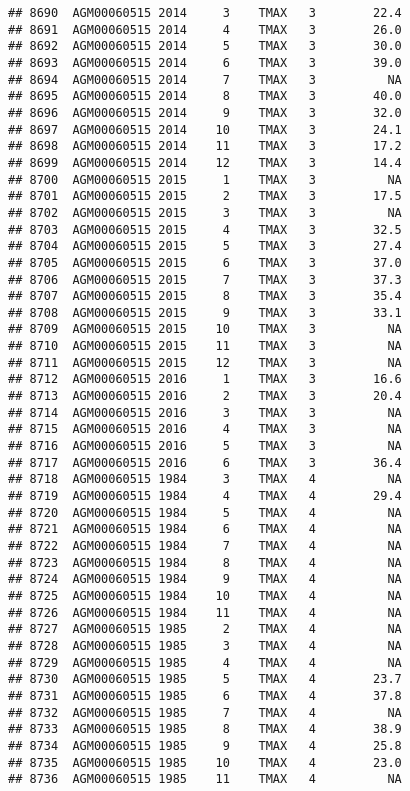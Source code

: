 \documentclass{article}\usepackage[]{graphicx}\usepackage[]{color}
\makeatletter
\newenvironment{kframe}{%
 \def\at@end@of@kframe{}%
 \ifinner\ifhmode%
  \def\at@end@of@kframe{\end{minipage}}%
  \begin{minipage}{\columnwidth}%
 \fi\fi%
 \def\FrameCommand##1{\hskip\@totalleftmargin \hskip-\fboxsep
 \colorbox{shadecolor}{##1}\hskip-\fboxsep
     \hskip-\linewidth \hskip-\@totalleftmargin \hskip\columnwidth}%
 \MakeFramed {\advance\hsize-\width
   \@totalleftmargin\z@ \linewidth\hsize
   \@setminipage}}%
 {\par\unskip\endMakeFramed%
 \at@end@of@kframe}
\newenvironment{knitrout}{}{} %
\makeatother
\begin{document}
\begin{knitrout}
\begin{kframe}
\begin{verbatim}
## 8690  AGM00060515 2014     3    TMAX   3        22.4
## 8691  AGM00060515 2014     4    TMAX   3        26.0
## 8692  AGM00060515 2014     5    TMAX   3        30.0
## 8693  AGM00060515 2014     6    TMAX   3        39.0
## 8694  AGM00060515 2014     7    TMAX   3          NA
## 8695  AGM00060515 2014     8    TMAX   3        40.0
## 8696  AGM00060515 2014     9    TMAX   3        32.0
## 8697  AGM00060515 2014    10    TMAX   3        24.1
## 8698  AGM00060515 2014    11    TMAX   3        17.2
## 8699  AGM00060515 2014    12    TMAX   3        14.4
## 8700  AGM00060515 2015     1    TMAX   3          NA
## 8701  AGM00060515 2015     2    TMAX   3        17.5
## 8702  AGM00060515 2015     3    TMAX   3          NA
## 8703  AGM00060515 2015     4    TMAX   3        32.5
## 8704  AGM00060515 2015     5    TMAX   3        27.4
## 8705  AGM00060515 2015     6    TMAX   3        37.0
## 8706  AGM00060515 2015     7    TMAX   3        37.3
## 8707  AGM00060515 2015     8    TMAX   3        35.4
## 8708  AGM00060515 2015     9    TMAX   3        33.1
## 8709  AGM00060515 2015    10    TMAX   3          NA
## 8710  AGM00060515 2015    11    TMAX   3          NA
## 8711  AGM00060515 2015    12    TMAX   3          NA
## 8712  AGM00060515 2016     1    TMAX   3        16.6
## 8713  AGM00060515 2016     2    TMAX   3        20.4
## 8714  AGM00060515 2016     3    TMAX   3          NA
## 8715  AGM00060515 2016     4    TMAX   3          NA
## 8716  AGM00060515 2016     5    TMAX   3          NA
## 8717  AGM00060515 2016     6    TMAX   3        36.4
## 8718  AGM00060515 1984     3    TMAX   4          NA
## 8719  AGM00060515 1984     4    TMAX   4        29.4
## 8720  AGM00060515 1984     5    TMAX   4          NA
## 8721  AGM00060515 1984     6    TMAX   4          NA
## 8722  AGM00060515 1984     7    TMAX   4          NA
## 8723  AGM00060515 1984     8    TMAX   4          NA
## 8724  AGM00060515 1984     9    TMAX   4          NA
## 8725  AGM00060515 1984    10    TMAX   4          NA
## 8726  AGM00060515 1984    11    TMAX   4          NA
## 8727  AGM00060515 1985     2    TMAX   4          NA
## 8728  AGM00060515 1985     3    TMAX   4          NA
## 8729  AGM00060515 1985     4    TMAX   4          NA
## 8730  AGM00060515 1985     5    TMAX   4        23.7
## 8731  AGM00060515 1985     6    TMAX   4        37.8
## 8732  AGM00060515 1985     7    TMAX   4          NA
## 8733  AGM00060515 1985     8    TMAX   4        38.9
## 8734  AGM00060515 1985     9    TMAX   4        25.8
## 8735  AGM00060515 1985    10    TMAX   4        23.0
## 8736  AGM00060515 1985    11    TMAX   4          NA

\end{verbatim}
\end{kframe}
\end{knitrout}
\end{document}
